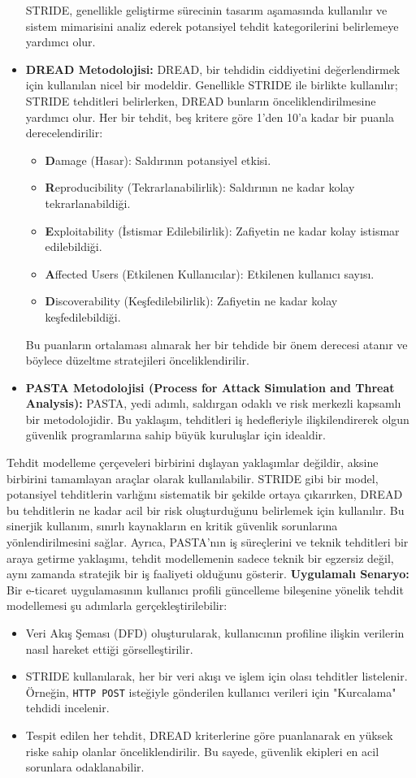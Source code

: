 \begin{itemize}
STRIDE, genellikle geliştirme sürecinin tasarım aşamasında kullanılır ve sistem mimarisini analiz ederek potansiyel tehdit kategorilerini belirlemeye yardımcı olur.
\item \textbf{DREAD Metodolojisi:} DREAD, bir tehdidin ciddiyetini değerlendirmek için kullanılan nicel bir modeldir. Genellikle STRIDE ile birlikte kullanılır; STRIDE tehditleri belirlerken, DREAD bunların önceliklendirilmesine yardımcı olur. Her bir tehdit, beş kritere göre 1'den 10'a kadar bir puanla derecelendirilir:
\begin{itemize}
    \item \textbf{D}amage (Hasar): Saldırının potansiyel etkisi.
    \item \textbf{R}eproducibility (Tekrarlanabilirlik): Saldırının ne kadar kolay tekrarlanabildiği.
    \item \textbf{E}xploitability (İstismar Edilebilirlik): Zafiyetin ne kadar kolay istismar edilebildiği.
    \item \textbf{A}ffected Users (Etkilenen Kullanıcılar): Etkilenen kullanıcı sayısı.
    \item \textbf{D}iscoverability (Keşfedilebilirlik): Zafiyetin ne kadar kolay keşfedilebildiği.
\end{itemize}
Bu puanların ortalaması alınarak her bir tehdide bir önem derecesi atanır ve böylece düzeltme stratejileri önceliklendirilir.
\item \textbf{PASTA Metodolojisi (Process for Attack Simulation and Threat Analysis):} PASTA, yedi adımlı, saldırgan odaklı ve risk merkezli kapsamlı bir metodolojidir. Bu yaklaşım, tehditleri iş hedefleriyle ilişkilendirerek olgun güvenlik programlarına sahip büyük kuruluşlar için idealdir.
\end{itemize}
Tehdit modelleme çerçeveleri birbirini dışlayan yaklaşımlar değildir, aksine birbirini tamamlayan araçlar olarak kullanılabilir. STRIDE gibi bir model, potansiyel tehditlerin varlığını sistematik bir şekilde ortaya çıkarırken, DREAD bu tehditlerin ne kadar acil bir risk oluşturduğunu belirlemek için kullanılır. Bu sinerjik kullanım, sınırlı kaynakların en kritik güvenlik sorunlarına yönlendirilmesini sağlar. Ayrıca, PASTA'nın iş süreçlerini ve teknik tehditleri bir araya getirme yaklaşımı, tehdit modellemenin sadece teknik bir egzersiz değil, aynı zamanda stratejik bir iş faaliyeti olduğunu gösterir.
\textbf{Uygulamalı Senaryo:}
Bir e-ticaret uygulamasının kullanıcı profili güncelleme bileşenine yönelik tehdit modellemesi şu adımlarla gerçekleştirilebilir:
\begin{itemize}
\item Veri Akış Şeması (DFD) oluşturularak, kullanıcının profiline ilişkin verilerin nasıl hareket ettiği görselleştirilir.
\item STRIDE kullanılarak, her bir veri akışı ve işlem için olası tehditler listelenir. Örneğin, \texttt{HTTP POST} isteğiyle gönderilen kullanıcı verileri için "Kurcalama" tehdidi incelenir.
\item Tespit edilen her tehdit, DREAD kriterlerine göre puanlanarak en yüksek riske sahip olanlar önceliklendirilir. Bu sayede, güvenlik ekipleri en acil sorunlara odaklanabilir.
\end{itemize}
